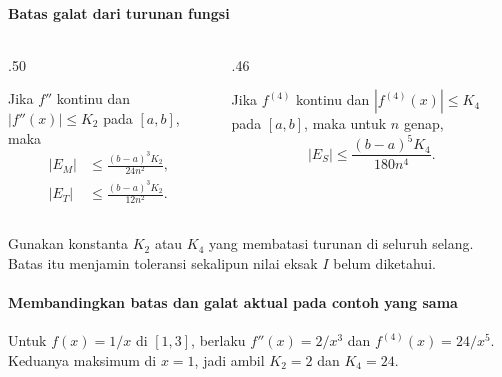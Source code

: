 \documentclass{../../kalkulus-ppt}
\begin{document}
\begin{frame}{\insertsection}
    \framesubtitle{Batas galat dari turunan fungsi}
    \begin{columns}[t,onlytextwidth]
        \begin{column}{.50\textwidth}
            \begin{teorema}
                Jika $f''$ kontinu dan $|f''(x)|\le K_2$ pada $[a,b]$, maka
                \[
                    \begin{aligned}
                        |E_M|&\le\frac{(b-a)^3K_2}{24n^2},\\
                        |E_T|&\le\frac{(b-a)^3K_2}{12n^2}.
                    \end{aligned}
                \]
            \end{teorema}
        \end{column}
        \begin{column}{.46\textwidth}
            \begin{teorema}[Simpson]
                Jika $f^{(4)}$ kontinu dan $|f^{(4)}(x)|\le K_4$ pada $[a,b]$,
                maka untuk $n$ genap,
                \[
                    |E_S|\le\frac{(b-a)^5K_4}{180n^4}.
                \]
            \end{teorema}
        \end{column}
    \end{columns}
    Gunakan konstanta $K_2$ atau $K_4$ yang membatasi turunan di seluruh selang.
    Batas itu menjamin toleransi sekalipun nilai eksak $I$ belum diketahui.
\end{frame}

\begin{frame}{\insertsection}
    \framesubtitle{Membandingkan batas dan galat aktual pada contoh yang sama}
    Untuk $f(x)=1/x$ di $[1,3]$, berlaku $f''(x)=2/x^3$ dan
    $f^{(4)}(x)=24/x^5$. Keduanya maksimum di $x=1$, jadi ambil
    $K_2=2$ dan $K_4=24$.
\end{frame}
\end{document}
